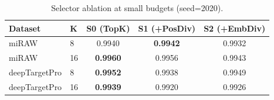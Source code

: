 \begin{table}[t]
  \centering
  \caption{Selector ablation at small budgets (seed=2020).}
  \label{tab:selector_ablation_small_k}
  \small
  \begin{tabular}{llccc}
    \toprule
    \textbf{Dataset} & \textbf{K} & \textbf{S0 (TopK)} & \textbf{S1 (+PosDiv)} & \textbf{S2 (+EmbDiv)} \\
    \midrule
    miRAW & 8 & 0.9940 & \textbf{0.9942} & 0.9932 \\
    miRAW & 16 & \textbf{0.9960} & 0.9956 & 0.9943 \\
    deepTargetPro & 8 & \textbf{0.9952} & 0.9938 & 0.9949 \\
    deepTargetPro & 16 & \textbf{0.9939} & 0.9920 & 0.9926 \\
    \bottomrule
  \end{tabular}
\end{table}